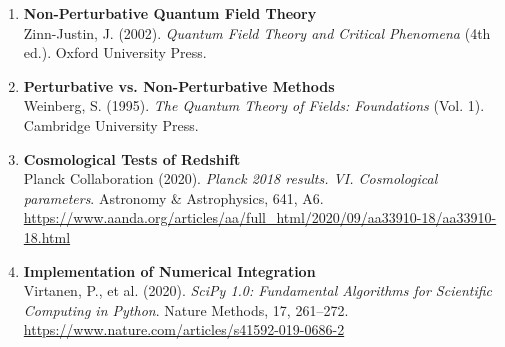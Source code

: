 \begin{enumerate}
		\item \textbf{Non-Perturbative Quantum Field Theory} \\
		Zinn-Justin, J. (2002). \textit{Quantum Field Theory and Critical Phenomena} (4th ed.). Oxford University Press.
		
		\item \textbf{Perturbative vs. Non-Perturbative Methods} \\
		Weinberg, S. (1995). \textit{The Quantum Theory of Fields: Foundations} (Vol. 1). Cambridge University Press.
		
		\item \textbf{Cosmological Tests of Redshift} \\
		Planck Collaboration (2020). \textit{Planck 2018 results. VI. Cosmological parameters}. Astronomy \& Astrophysics, 641, A6.\\
		\url{https://www.aanda.org/articles/aa/full_html/2020/09/aa33910-18/aa33910-18.html}
		
		\item \textbf{Implementation of Numerical Integration} \\
		Virtanen, P., et al. (2020). \textit{SciPy 1.0: Fundamental Algorithms for Scientific Computing in Python}. Nature Methods, 17, 261–272.\\
		\url{https://www.nature.com/articles/s41592-019-0686-2}
	\end{enumerate}
	
